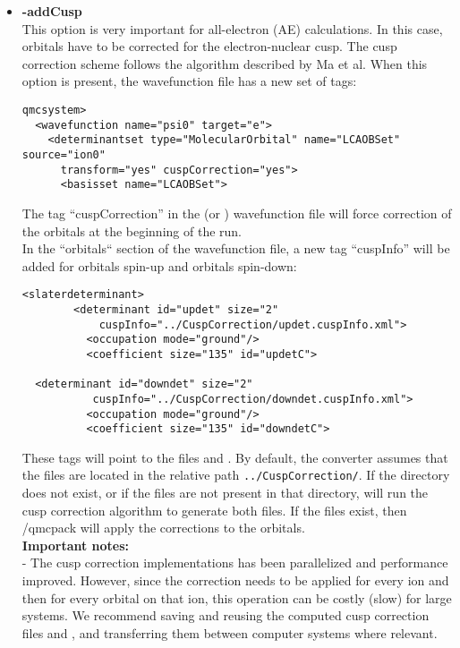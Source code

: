 \begin{itemize}
\begin{itemize}
\end{itemize}


\item \textbf{-addCusp} \\ This option is very important for
  all-electron (AE) calculations. In this case, orbitals have to be
  corrected for the electron-nuclear cusp. The cusp correction scheme
  follows the algorithm described by Ma et al. \cite{Ma2005}
  When this option is present, the wavefunction file has a new set of
  tags:

\begin{lstlisting}[style=QMCPXML]
 qmcsystem>
  <wavefunction name="psi0" target="e">
    <determinantset type="MolecularOrbital" name="LCAOBSet" source="ion0"
      transform="yes" cuspCorrection="yes">
      <basisset name="LCAOBSet">
\end{lstlisting}

The tag ``cuspCorrection'' in the  (or ) wavefunction file will force correction of the orbitals at the beginning of the \qmcpack run. \\
In the ``orbitals`` section of the wavefunction file, a new tag ``cuspInfo'' will be added for orbitals spin-up and orbitals spin-down:

\begin{lstlisting}[style=QMCPXML]
   <slaterdeterminant>
        <determinant id="updet" size="2"
            cuspInfo="../CuspCorrection/updet.cuspInfo.xml">
          <occupation mode="ground"/>
          <coefficient size="135" id="updetC">
          
  <determinant id="downdet" size="2"
           cuspInfo="../CuspCorrection/downdet.cuspInfo.xml">
          <occupation mode="ground"/>
          <coefficient size="135" id="downdetC">
\end{lstlisting}

These tags will point to the files  and
. By default, the converter assumes that
the files are located in the relative path
\texttt{../CuspCorrection/}. If the directory
 does not exist, or if the files are not
present in that directory, \qmcpack will run the cusp correction
algorithm to generate both files.  If the files exist, then /qmcpack
will apply the corrections to the orbitals. \\

\textbf{Important notes:}\\
- The cusp correction implementations has been parallelized and performance improved.  However, since the correction needs
to be applied for every ion and then for every orbital on that ion, this operation can be costly (slow) for large
systems. We recommend saving and reusing the computed cusp correction files  and
, and transferring them between computer systems where relevant.
\\


\end{itemize}
